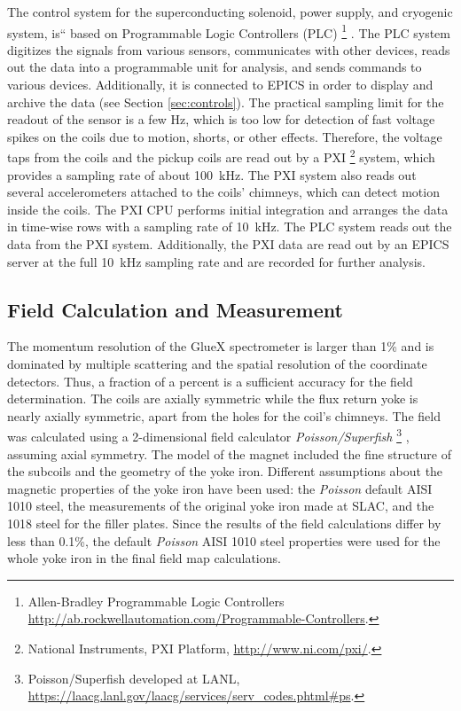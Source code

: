 The control system for the superconducting solenoid, power supply, 
and cryogenic system, is`` based on Programmable Logic
Controllers (PLC)%
\footnote{
  Allen-Bradley Programmable Logic Controllers
  \url{http://ab.rockwellautomation.com/Programmable-Controllers}.
}%
.
The PLC system digitizes the signals from various sensors, communicates with
other devices, reads out the data into a programmable unit for
analysis, and sends commands to various devices. Additionally, it is
connected to EPICS in order to display and archive the data (see
Section \ref{sec:controls}).  The practical sampling limit for the readout of the sensor
is a few Hz, which is too low for
detection of fast voltage spikes on the coils due to motion, shorts,
or other effects. Therefore, the voltage taps from the coils
and the pickup coils are read
out by a PXI%
\footnote{
  National Instruments, PXI Platform, \url{http://www.ni.com/pxi/}.
}%
system, which provides a sampling rate of about 100~kHz. The
PXI system also reads out several accelerometers attached to the
coils' chimneys, which can detect motion inside the coils. The PXI
CPU performs initial integration and arranges the data in time-wise
rows with a sampling rate of 10~kHz.  The PLC system reads out the
data from the PXI system. Additionally, the PXI data are read out by
an EPICS server at the full 10~kHz sampling rate and are recorded for further analysis.

\subsection[Field Calculation and Measurement]{
         Field Calculation and Measurement
        \label{sec:sol:field}
}

The momentum resolution of the GlueX spectrometer is larger than
1\% and is dominated by multiple scattering and the spatial
resolution of the coordinate detectors.  Thus, a fraction of a percent is a
sufficient accuracy for the field determination.  The coils are
axially symmetric while the flux return yoke is nearly axially
symmetric, apart from the holes for the coil's chimneys. The field was
calculated using a 2-dimensional field calculator {\it
  Poisson/Superfish}%
\footnote{
   Poisson/Superfish developed at LANL,
   \url{https://laacg.lanl.gov/laacg/services/serv_codes.phtml\#ps}.
} 
, assuming axial symmetry.  The model of the magnet included the
fine structure of the subcoils and the geometry of the yoke
iron. Different assumptions about the magnetic properties of the yoke
iron have been used: the {\it Poisson} default AISI 1010 steel, the
measurements of the original yoke iron made at SLAC, and the 1018
steel for the filler plates. Since the results of the field
calculations differ by less than 0.1\%, the default {\it Poisson} AISI
1010 steel properties were used for the whole yoke iron in the final
field map calculations.

